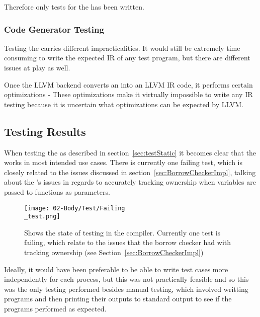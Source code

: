 Therefore only tests for the \borrowChecker{} has been written.

\subsubsection{Code Generator Testing}

Testing the \codeGen{} carries different impracticalities. It would still be
extremely time consuming to write the expected IR of any test program, but there are
different issues at play as well. 

Once the LLVM backend converts an \ast{} into an LLVM IR code, it performs certain
optimizations - These optimizations make it virtually impossible to write any IR
testing because it is uncertain what optimizations can be expected by LLVM.

\subsection{Testing Results}


When testing the \borrowChecker{} as described in section~\ref{sec:testStatic} it
becomes clear that the \borrowChecker{} works in most intended use cases. There is
currently one failing test, which is closely related to the issues discussed in
section~\ref{sec:BorrowCheckerImpl}, talking about the \borrowChecker's issues in
regards to accurately tracking ownership when variables are passed to functions as
parameters.

\begin{figure}[ht]
  \texttt{[image: 02-Body/Test/Failing\\\_test.png]}
  \caption{Shows the state of testing in the \lang{} compiler. Currently one test is
  failing, which relate to the issues that the borrow checker had with tracking
ownership (see Section~\ref{sec:BorrowCheckerImpl})}
  \label{fig:failTest}
\end{figure}

Ideally, it would have been preferable to be able to write test cases more
independently for each process, but this was not practically feasible and so this was
the only testing performed besides manual testing, which involved writting programs
and then printing their outputs to standard output to see if the programs performed
as expected.

\newpage
